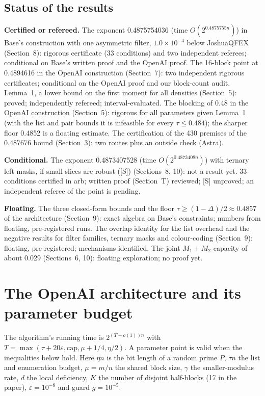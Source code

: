 \documentclass[11pt]{article}
\newcommand{\eps}{\varepsilon}
\theoremstyle{plain}
\begin{document}
\subsection*{Status of the results}
\textbf{Certified or refereed.} The exponent 0.4875754036 (time $O(2^{0.4875755n})$) in Base's construction with one asymmetric filter, $1.0\times10^{-4}$ below JoshuaQFEX (Section~8): rigorous certificate (33 conditions) and two independent referees; conditional on Base's written proof and the OpenAI proof. The 16-block point at 0.4894616 in the OpenAI construction (Section~7): two independent rigorous certificates; conditional on the OpenAI proof and our block-count audit. Lemma~1, a lower bound on the first moment for all densities (Section~5): proved; independently refereed; interval-evaluated. The blocking of 0.48 in the OpenAI construction (Section~5): rigorous for all parameters given Lemma~1 (with the list and pair bounds it is infeasible for every $\tau \le 0.484$); the sharper floor 0.4852 is a floating estimate. The certification of the 430 premises of the 0.487676 bound (Section~3): two routes plus an outside check (Astra).

\textbf{Conditional.} The exponent 0.4873407528 (time $O(2^{0.4873408n})$) with ternary left masks, if small slices are robust ([S]) (Sections~8, 10): not a result yet. 33 conditions certified in arb; written proof (Section~T) reviewed; [S] unproved; an independent referee of the point is pending.

\textbf{Floating.} The three closed-form bounds and the floor $\tau \ge (1 - \Delta)/2 \approx 0.4857$ of the architecture (Section~9): exact algebra on Base's constraints; numbers from floating, pre-registered runs. The overlap identity for the list overhead and the negative results for filter families, ternary masks and colour-coding (Section~9): floating, pre-registered; mechanisms identified. The joint $M_1 + M_2$ capacity of about 0.029 (Sections~6, 10): floating exploration; no proof yet.

\section{The OpenAI architecture and its parameter budget}

The algorithm's running time is $2^{(T+o(1))n}$ with $T = \max(\tau + 20\eps, \mathrm{cap}, \mu + 1/4, \eta/2)$. A parameter point is valid when the inequalities below hold. Here $\eta n$ is the bit length of a random prime $P$, $\tau n$ the list and enumeration budget, $\mu = m/n$ the shared block size, $\gamma$ the smaller-modulus rate, $d$ the local deficiency, $K$ the number of disjoint half-blocks (17 in the paper), $\eps = 10^{-8}$ and guard $g = 10^{-5}$.
\end{document}
